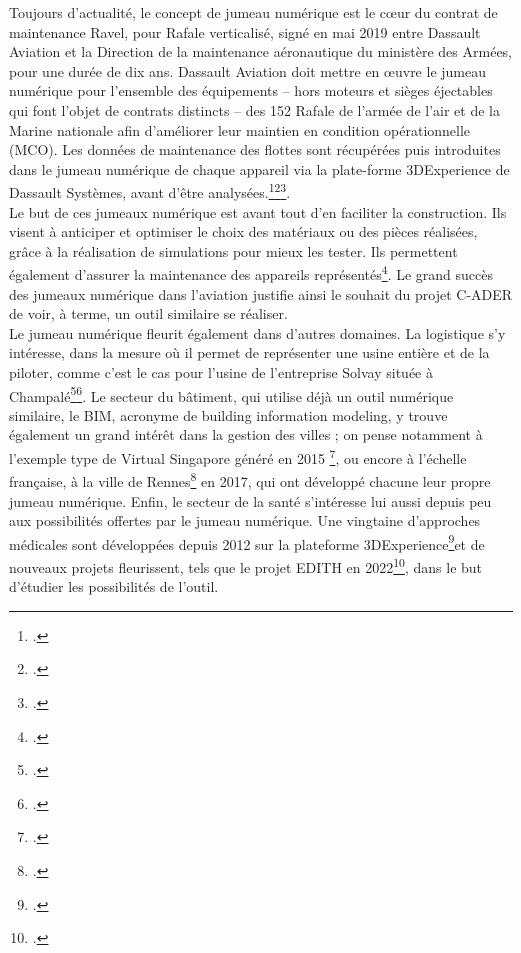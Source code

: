 Toujours d'actualité, le concept de jumeau numérique est le cœur du contrat de maintenance Ravel, pour Rafale verticalisé, signé en mai 2019 entre Dassault Aviation et la Direction de la maintenance aéronautique du ministère des Armées, pour une durée de dix ans. Dassault Aviation doit mettre en œuvre le jumeau numérique pour l’ensemble des équipements – hors moteurs et sièges éjectables qui font l’objet de contrats distincts – des 152 Rafale de l’armée de l’air et de la Marine nationale afin d’améliorer leur maintien en condition opérationnelle (MCO). Les données de maintenance des flottes sont récupérées puis introduites dans le jumeau numérique de chaque appareil via la plate-forme 3DExperience de Dassault Systèmes, avant d'être analysées.\footcite{olivierAvionneursEmparentJumeau2020}\footcite{MirorringRealityDigital2024}\footcite{MiroirMiroirJumeau2021}.\\

Le but de ces jumeaux numérique est avant tout d'en faciliter la construction. Ils visent à anticiper et optimiser le choix des matériaux ou des pièces réalisées, grâce à la réalisation de simulations pour mieux les tester. Ils permettent également d'assurer la maintenance des appareils représentés\footcite{attaranDigitalTwinsIndustrial2024}. Le grand succès des jumeaux numérique dans l'aviation justifie ainsi le souhait du projet C-ADER de voir, à terme, un outil similaire se réaliser.\\

Le jumeau numérique fleurit également dans d'autres domaines. La logistique s'y intéresse, dans la mesure où il permet de représenter une usine entière et de la piloter, comme c'est le cas pour l'usine de l’entreprise Solvay située à Champalé\footcite{parisotCreerJumeauNumerique2015}\footcite{lawtonPremiersJoursJumeaux2021}. Le secteur du bâtiment, qui utilise déjà un outil numérique similaire, le BIM, acronyme de building information modeling, y trouve également un grand intérêt dans la gestion des villes ; on pense notamment à l'exemple type de Virtual Singapore généré en 2015 \footcite{walkerSingaporeDigitalTwin2023}, ou encore à l'échelle française, à la ville de Rennes\footcite{RennesMetropole2017} en 2017, qui ont développé chacune leur propre jumeau numérique. Enfin, le secteur de la santé s'intéresse lui aussi depuis peu aux possibilités offertes par le jumeau numérique. Une vingtaine d’approches médicales sont développées depuis 2012 sur la plateforme 3DExperience\footcite{jaliniereJumeauxNumeriquesNouveaux2021}et de nouveaux projets fleurissent, tels que le projet EDITH en 2022\footcite{SanteEcosystemeEuropeen2024}, dans le but d'étudier les possibilités de l'outil.\\

